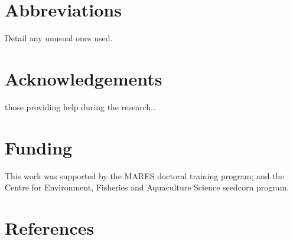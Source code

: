 \documentclass[review]{elsarticle}
\begin{document}
\section*{Abbreviations} Detail any unusual ones used.

\section*{Acknowledgements} those providing help during the research..

\section*{Funding} This work was supported by the MARES doctoral training
program; and the Centre for Environment, Fisheries and Aquaculture Science
seedcorn program.

\clearpage

\section*{References}


\end{document}
